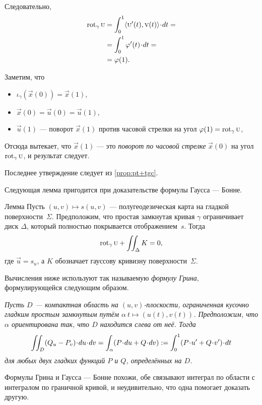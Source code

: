 Следовательно,
\begin{align*}
\rot_\gamma\vec u&=\int_0^1\langle\vec u'(t),\vec v(t)\rangle\cdot dt=
\\
&=\int_0^1\phi'(t)\cdot dt=
\\
&=\phi(1).
\end{align*}

Заметим, что 
\begin{itemize}
\item $\iota_\gamma(\vec x(0))=\vec x(1)$,

\item  $\vec x (0) = \vec u (0) = \vec u (1),$ 

\item $\vec u(1)$ --- поворот $\vec x(1)$ против часовой стрелки на угол $\phi(1)\z=\rot_\gamma\vec u$,

\end{itemize}
Отсюда вытекает, что $\vec x(1)$ --- это \textit{поворот по часовой стрелке} $\vec x(0)$ на угол $\mathop{\rm rot}\nolimits_\gamma\text{\sc{u}}$, и результат следует.

Последнее утверждение следует из \ref{prop:pt+tgc}.
\qeds


Следующая лемма пригодится при доказательстве формулы Гаусса --- Бонне.

\begin{thm}{Лемма}\label{lem:rotation-semigeoesic}
Пусть $(u,v)\mapsto s(u,v)$ --- полугеодезическая карта на гладкой поверхности~$\Sigma$.
Предположим, что простая замкнутая кривая $\gamma$ ограничивает диск $\Delta$, который полностью покрывается отображением~$s$.
Тогда 
\[\mathop{\rm rot}\nolimits_\gamma\text{\sc{u}}+\iint_\Delta K=0,\]
где $\vec u=s_u$, а $K$ обозначает гауссову кривизну поверхности~$\Sigma$.
\end{thm}

Вычисления ниже используют так называемую \emph{формулу Грина}, формулирующейся следующим образом.

\textit{Пусть $D$ --- компактная область на $(u,v)$-плоскости, ограниченная кусочно гладким простым замкнутым путём $\alpha\:t\mapsto (u(t),v(t))$.
Предположим, что $\alpha$ ориентирована так, что $D$ находится слева от неё.
Тогда}
\[\iint_D (Q_u- P_v)\cdot du\cdot dv=\int_\alpha (P\cdot du+Q\cdot dv)\df \int_0^1 (P\cdot u'+Q\cdot v')\cdot dt\]
\textit{для любых двух гладких функций $P$ и $Q$, определённых на $D$.}

Формулы Грина и Гаусса --- Бонне похожи, обе связывают интеграл по области с интегралом по граничной кривой, и неудивительно, что одна помогает доказать другую.

